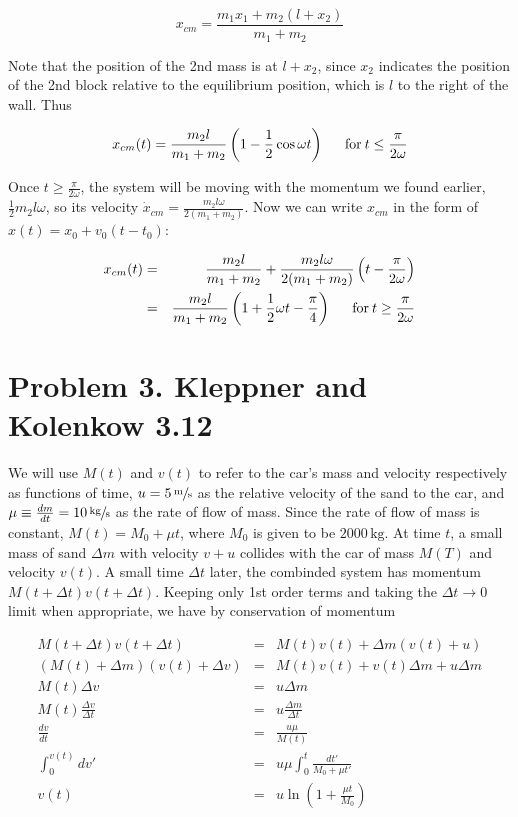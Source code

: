 \documentclass[11pt]{article}
\begin{document}
$$x_{cm} = \frac{m_1 x_1 + m_2 (l + x_2)}{m_1 + m_2}$$

Note that the position of the 2nd mass is at $l + x_2$, since $x_2$ indicates the position of the 2nd block relative to the equilibrium position, which is $l$ to the right of the wall. Thus

$$x_{cm}(t) = \frac{m_2 l}{m_1+m_2} \left(1 - \frac{1}{2}\cos{\omega t}\right) \indent \textrm{for} \:t \leq \frac{\pi}{2\omega}$$

Once $t \geq \frac{\pi}{2\omega}$, the system will be moving with the momentum we found earlier, $\frac{1}{2} m_2 l \omega$, so its velocity $\dot{x}_{cm} = \frac{ m_2 l \omega}{2(m_1+m_2)}$. Now we can write $x_{cm}$ in the form of $x(t) = x_0 + v_0 (t - t_0)$:

\begin{eqnarray*}
x_{cm}(t) &=& \frac{m_2 l}{m_1 + m_2} + \frac{m_2 l \omega}{2(m_1+m_2)}\left(t - \frac{\pi}{2 \omega} \right)\\
&=& \frac{m_2 l}{m_1+m_2}\left(1 + \frac{1}{2}\omega t - \frac{\pi}{4} \right) \indent \textrm{for} \: t \geq \frac{\pi}{2\omega}
\end{eqnarray*}

\section*{Problem 3. Kleppner and Kolenkow 3.12}

We will use $M(t)$ and $v(t)$ to refer to the car's mass and velocity respectively as functions of time, $u = 5 \, \sfrac{\textrm{m}}{\textrm{s}}$ as the relative velocity of the sand to the car, and $\mu \equiv \frac{dm}{dt} = 10 \, \sfrac{\textrm{kg}}{\textrm{s}}$ as the rate of flow of mass. Since the rate of flow of mass is constant, $M(t) = M_0 + \mu t$, where $M_0$ is given to be $2000 \, \textrm{kg}$. At time $t$, a small mass of sand $\Delta m$ with velocity $v + u$ collides with the car of mass $M(T)$ and velocity $v(t)$. A small time $\Delta t$ later, the combinded system has momentum $M(t + \Delta t) v(t + \Delta t)$. Keeping only 1st order terms and taking the $\Delta t \rightarrow 0$ limit when appropriate, we have by conservation of momentum

\begin{eqnarray*}
M(t+\Delta t)v(t+\Delta t) &=& M(t)v(t) + \Delta m (v(t) + u)\\
(M(t) + \Delta m)(v(t) + \Delta v) &=& M(t)v(t) + v(t) \Delta m + u \Delta m\\
M(t) \Delta v &=& u \Delta m\\
M(t) \frac{\Delta v}{\Delta t} &=& u \frac{\Delta m}{\Delta t}\\
\frac{dv}{dt} &=& \frac{u \mu}{M(t)}\\
\int_0^{v(t)} dv' &=& u \mu \int_0^t \frac{dt'}{M_0 + \mu t'}\\
v(t) &=& u \ln{\left(1 + \frac{\mu t}{M_0}\right)}
\end{eqnarray*}
\end{document}
